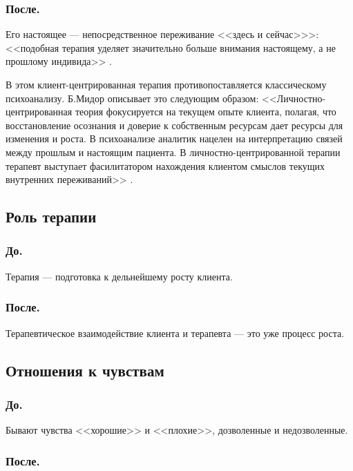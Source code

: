 \documentclass{../../common/thesisbyxetex}
\begin{document}
\subsubsection*{После.}

Его настоящее --- непосредственное переживание <<здесь и сейчас>>>: <<подобная терапия уделяет 
значительно больше внимания настоящему, а не прошлому индивида>> \cite[14]{rogersConsult}.

В этом клиент-центрированная терапия противопоставляется классическому психоанализу. Б.Мидор 
описывает это следующим образом: <<Личностно-центрированная теория фокусируется на текущем опыте 
клиента, полагая, что восстановление осознания и доверие к собственным ресурсам дает ресурсы для 
изменения и роста. В психоанализе аналитик нацелен на интерпретацию связей между прошлым и
настоящим пациента. В личностно-центрированной терапии терапевт выступает фасилитатором нахождения 
клиентом смыслов текущих внутренних переживаний>> \cite{mid}.

\subsection*{Роль терапии}

\subsubsection*{До.}

Терапия --- подготовка к дельнейшему росту клиента.

\subsubsection*{После.}

Терапевтическое взаимодействие клиента и терапевта --- это уже процесс роста.

\subsection*{Отношения к чувствам}


\subsubsection*{До.}

Бывают чувства <<хорошие>> и <<плохие>>, дозволенные и недозволенные.

\subsubsection*{После.}
\end{document}
